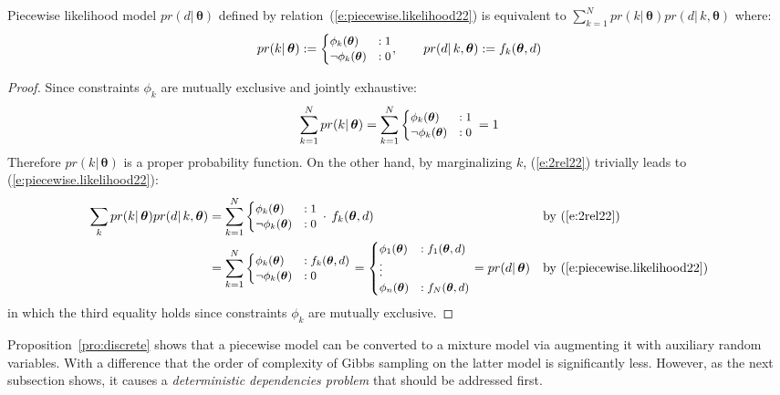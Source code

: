 \begin{proposition}
\label{pro:discrete}
Piecewise likelihood model $pr(d | \, \boldsymbol\theta)$ 
defined by relation~(\ref{e:piecewise.likelihood22}) is equivalent to 
$\sum_{k = 1}^N pr(k | \, \boldsymbol\theta) pr(d | \, k, \boldsymbol\theta)$
where:
\begin{equation}
\label{e:2rel22}
pr(k |\, \boldsymbol\theta) := 
{\footnotesize
\begin{cases}
\phi_k(\boldsymbol\theta)  &: 1\\
\neg \phi_k(\boldsymbol\theta) &: 0
\end{cases}
}%
, 
\qquad 
pr(d | \, k, \boldsymbol\theta) := f_k(\boldsymbol\theta, d)
\end{equation}
%
\end{proposition}
\begin{proof}
Since constraints $\phi_k$ are mutually exclusive and jointly exhaustive: 
$$\sum_{k= 1}^N pr(k | \, \boldsymbol\theta) = 
\sum_{k=1}^N
{\footnotesize
\begin{cases}
\phi_k(\boldsymbol\theta)   &: 1\\
\neg \phi_k(\boldsymbol\theta)  &: 0
\end{cases}
}%
\, =1
$$
Therefore $pr(k | \, \boldsymbol\theta)$ is a proper probability function. 
On the other hand, by marginalizing $k$, (\ref{e:2rel22}) trivially leads to (\ref{e:piecewise.likelihood22}):
\begin{align*}
\sum_{k} pr(k | \, \boldsymbol\theta)pr(d | \, k, \boldsymbol\theta) 
&= 
\sum_{k=1}^N  
{\footnotesize
\begin{cases}
\phi_k(\boldsymbol\theta)  &: 1\\
\neg \phi_k(\boldsymbol\theta) &: 0
\end{cases}
}%
\, \cdot \, f_k(\boldsymbol \theta, d)
&&\text{by (\ref{e:2rel22})}
\\
&=
\sum_{k=1}^N 
{\footnotesize
\begin{cases}
		\phi_k(\boldsymbol\theta)  &: f_k(\boldsymbol\theta, d)\\
\neg 	\phi_k(\boldsymbol\theta)  &: 0
\end{cases}
}%
= {\footnotesize
\begin{cases}
\phi_1(\boldsymbol\theta)  &: f_1(\boldsymbol\theta, d)\\
\vdots\\
\phi_n(\boldsymbol\theta)  &: f_N(\boldsymbol\theta, d)
\end{cases}
}%
= pr(d | \, \boldsymbol\theta) 
&&\text{by (\ref{e:piecewise.likelihood22})}
\end{align*}
in which the third equality holds since constraints $\phi_k$ are mutually exclusive. 
\end{proof}
Proposition~\ref{pro:discrete} shows that a piecewise model can be converted  to a mixture model via augmenting it with auxiliary random variables. 
With a difference that the order of complexity of Gibbs sampling on the latter model is significantly less.
However, as the next subsection shows, it causes a \emph{deterministic dependencies problem} that should be addressed first.
 
